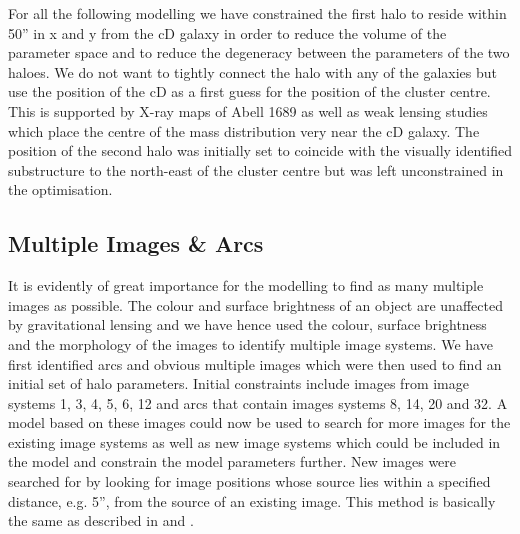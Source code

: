 \documentclass[useAMS,usenatbib]{mn2e}
\newcounter{two}   \setcounter{two}{2}
\begin{document}
For all the following modelling we have constrained the first halo to
reside within 50'' in x and y from the cD galaxy in order to reduce
the volume of the parameter space and to reduce the degeneracy between
the parameters of the two haloes. We do not want to tightly connect
the halo with any of the galaxies but use the position of the cD as a
first guess for the position of the cluster centre. This is supported
by \mbox{X-ray} maps of Abell 1689 \citep{xue:02,andersson:04} as well
as weak lensing studies \citep{king:02b} which place the centre of the
mass distribution very near the cD galaxy. The position of the second
halo was initially set to coincide with the visually identified
substructure to the north-east of the cluster centre but was left
unconstrained in the optimisation.


\subsection{Multiple Images \& Arcs}

It is evidently of great importance for the modelling to find as many
multiple images as possible. The colour and surface brightness of an
object are unaffected by gravitational lensing and we have hence used
the colour, surface brightness and the morphology of the images to
identify multiple image systems. We have first identified arcs and
obvious multiple images which were then used to find an initial set of
halo parameters. Initial constraints include images from image systems
1, 3, 4, 5, 6, 12 and arcs that contain images systems 8, 14, 20 and
32. A model based on these images could now be used to search for more
images for the existing image systems as well as new image systems
which could be included in the model and constrain the model
parameters further. New images were searched for by looking for image
positions whose source lies within a specified distance, e.g. 5'',
from the source of an existing image. This method is basically the
same as described in \citet{schramm:87} and \citet{kayser:88}.
\end{document}
